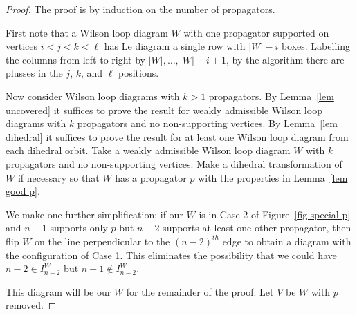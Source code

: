 \documentclass[11pt]{article}
\theoremstyle{remark}
\theoremstyle{definition}
\begin{document}
\begin{proof}
  The proof is by induction on the number of propagators.

  First note that a Wilson loop diagram $W$ with one propagator supported on vertices $i<j<k<\ell$ has Le diagram a single row with $|W|-i$ boxes.  Labelling the columns from left to right by $|W|, \ldots, |W|-i+1$, by the algorithm there are plusses in the $j$, $k$, and $\ell$ positions.

  Now consider Wilson loop diagrams with $k>1$ propagators.  By Lemma~\ref{lem uncovered} it suffices to prove the result for weakly admissible Wilson loop diagrams with $k$ propagators and no non-supporting vertices.  By Lemma~\ref{lem dihedral} it suffices to prove the result for at least one Wilson loop diagram from each dihedral orbit.  Take a weakly admissible Wilson loop diagram $W$ with $k$ propagators and no non-supporting vertices.  Make a dihedral transformation of $W$ if necessary so that $W$ has a propagator $p$ with the properties in Lemma~\ref{lem good p}.  

  We make one further simplification: if our $W$ is in Case 2 of Figure~\ref{fig special p} and $n-1$ supports only $p$ but $n-2$ supports at least one other propagator, then flip $W$ on the line perpendicular to the $(n-2)^{th}$ edge to obtain a diagram with the configuration of Case 1. This eliminates the possibility that we could have $n-2 \in I_{n-2}^W$ but $n-1 \not\in I_{n-2}^W$. 

  This diagram will be our $W$ for the remainder of the proof. Let $V$ be $W$ with $p$ removed. 


\end{proof}
\end{document}
